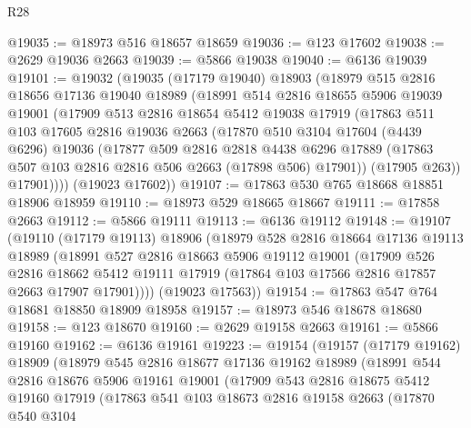 \begin{lexlean}{R28}
\begin{coremodule}
@19035 := @18973 @516 @18657 @18659
@19036 := @123 @17602
@19038 := @2629 @19036 @2663
@19039 := @5866 @19038
@19040 := @6136 @19039
@19101 := @19032
    (@19035
      (@17179 @19040)
      @18903
      (@18979
        @515
        @2816
        @18656
        @17136
        @19040
        @18989
        (@18991
          @514
          @2816
          @18655
          @5906
          @19039
          @19001
          (@17909
            @513
            @2816
            @18654
            @5412
            @19038
            @17919
            (@17863
              @511
              @103
              @17605
              @2816
              @19036
              @2663
              (@17870
                @510
                @3104
                @17604
                (@4439 @6296)
                @19036
                (@17877
                  @509
                  @2816
                  @2818
                  @4438
                  @6296
                  @17889
                  (@17863 @507 @103 @2816 @2816 @506 @2663 (@17898 @506) @17901))
                (@17905 @263))
              @17901))))
      (@19023 @17602))
@19107 := @17863 @530 @765 @18668 @18851 @18906 @18959
@19110 := @18973 @529 @18665 @18667
@19111 := @17858 @2663
@19112 := @5866 @19111
@19113 := @6136 @19112
@19148 := @19107
    (@19110
      (@17179 @19113)
      @18906
      (@18979
        @528
        @2816
        @18664
        @17136
        @19113
        @18989
        (@18991
          @527
          @2816
          @18663
          @5906
          @19112
          @19001
          (@17909
            @526
            @2816
            @18662
            @5412
            @19111
            @17919
            (@17864 @103 @17566 @2816 @17857 @2663 @17907 @17901))))
      (@19023 @17563))
@19154 := @17863 @547 @764 @18681 @18850 @18909 @18958
@19157 := @18973 @546 @18678 @18680
@19158 := @123 @18670
@19160 := @2629 @19158 @2663
@19161 := @5866 @19160
@19162 := @6136 @19161
@19223 := @19154
    (@19157
      (@17179 @19162)
      @18909
      (@18979
        @545
        @2816
        @18677
        @17136
        @19162
        @18989
        (@18991
          @544
          @2816
          @18676
          @5906
          @19161
          @19001
          (@17909
            @543
            @2816
            @18675
            @5412
            @19160
            @17919
            (@17863
              @541
              @103
              @18673
              @2816
              @19158
              @2663
              (@17870
                @540
                @3104

\end{coremodule}
\end{lexlean}
